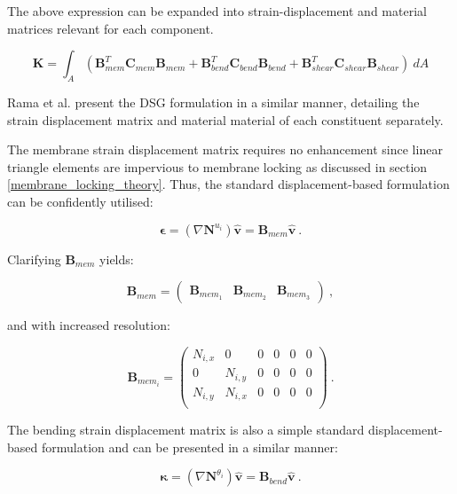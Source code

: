 The above expression can be expanded into strain-displacement and material matrices relevant for each component.

\begin{equation} 
\mathbf{K} = \int_A  (\mathbf{B}_{mem}^T \mathbf{C}_{mem} \mathbf{B}_{mem} + \mathbf{B}_{bend}^T \mathbf{C}_{bend} \mathbf{B}_{bend} + \mathbf{B}_{shear}^T \mathbf{C}_{shear} \mathbf{B}_{shear})\ dA
\label{eqt5}
\end{equation}

Rama et al. \cite{Ram16} present the DSG formulation in a similar manner, detailing the strain displacement matrix and material material of each constituent separately.

The membrane strain displacement matrix requires no enhancement since linear triangle elements are impervious to membrane locking as discussed in section \ref{membrane_locking_theory}. Thus, the standard displacement-based formulation can be confidently utilised:

\begin{equation}
\boldsymbol{\epsilon} =(\nabla \mathbf{N}^{u_{i}}) \hat{\mathbf{v}} 
= \mathbf{B}_{mem} \hat{\mathbf{v}}  
\label{eqt5_1}\ .
\end{equation}

Clarifying $\mathbf{B}_{mem}$ yields:

\begin{equation} 
\mathbf{B}_{mem} =  \begin{pmatrix}
\mathbf{B}_{mem_1} & \mathbf{B}_{mem_2} & \mathbf{B}_{mem_3}
\end{pmatrix} 
\label{eqt6}\ ,
\end{equation}

and with increased resolution:

\begin{equation} 
\mathbf{B}_{mem_i} =  \begin{pmatrix}
N_{i,x} & 0 & 0 & 0 & 0 & 0 \\
0 & N_{i,y} & 0 & 0 & 0 & 0 \\
N_{i,y} & N_{i,x} & 0 & 0 & 0 & 0 \\
\end{pmatrix} 
\label{eqt7}\ .
\end{equation}

The bending strain displacement matrix is also a simple standard displacement-based formulation and can be presented in a similar manner:

\begin{equation}
\boldsymbol{\kappa} =(\nabla \mathbf{N}^{\theta_{i}}) \hat{\mathbf{v}} 
= \mathbf{B}_{bend} \hat{\mathbf{v}}  
\label{eqt7_1}\ .
\end{equation}

